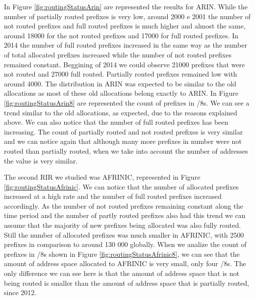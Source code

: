 \documentclass[11pt,a4paper]{scrreprt}
\begin{document}
In Figure \ref{fig:routingStatusArin} are represented the results for ARIN.  
While the number of partially routed prefixes is very low, around 2000 e 2001 the number of not routed prefixes and full routed prefixes is much higher and almost the same, around 18000 for the not routed prefixes and 17000 for full routed prefixes. In 2014 the number of full routed prefixes increased in the same way as the number of total allocated prefixes increased while the number of not routed prefixes remained constant. Beggining of 2014 we could observe 21000 prefixes that were not routed and 27000 full routed. Partially routed prefixes remained low with around 4000. The distribution in ARIN was expected to be similar to the old allocations as most of these old allocations belong exactly to ARIN. In Figure \ref{fig:routingStatusArin8} are represented the count of prefixes in /8s. We can see a trend similar to the old allocations, as expected, due to the reasons explained above. We can also notice that the number of full routed prefixes has been increasing. The count of partially routed and not routed prefixes is very similar and we can notice again that although many more prefixes in number were not routed than partially routed, when we take into account the number of addresses the value is very similar. 

The second RIR we studied was AFRINIC, represented in Figure \ref{fig:routingStatusAfrinic}. We can notice that the number of allocated prefixes increased at a high rate and the number of full routed prefixes increased accordingly. As the number of not routed prefixes remaining constant along the time period and the number of partly routed prefixes also had this trend we can assume that the majority of new prefixes being allocated was also fully routed. Still the number of allocated prefixes was much smaller in AFRINIC, with 2500 prefixes in comparison to  around 130 000 globally. When we analize the count of prefixes in /8s shown in Figure \ref{fig:routingStatusAfrinic8}, we can see that the amount of address space allocated to AFRINIC is very small, only four /8s. The only difference we can see here is that the amount of address space that is not being routed is smaller than the amount of address space that is partially routed, since 2012. 
\end{document}
